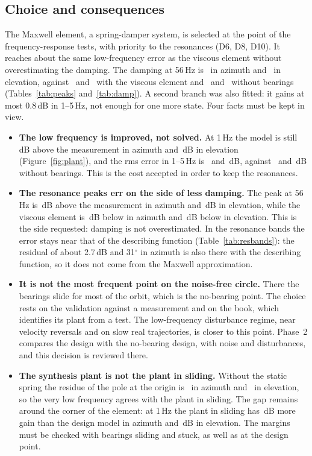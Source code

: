 \documentclass[10pt,a4paper]{article}
\numberwithin{equation}{section}
\begin{document}
\subsection{Choice and consequences}
The Maxwell element, a spring-damper system, is selected at the point of the frequency-response tests, with priority to the resonances (D6, D8, D10). It reaches about the same low-frequency error as the viscous element without overestimating the damping. The damping at 56\,Hz is \zMA\ in azimuth and \zMP\ in elevation, against \zVA\ and \zVP\ with the viscous element and \zNA\ and \zNP\ without bearings (Tables~\ref{tab:peaks} and~\ref{tab:damp}). A second branch was also fitted: it gains at most 0.8\,dB in 1--5\,Hz, not enough for one more state. Four facts must be kept in view.
\begin{itemize}
\item \textbf{The low frequency is improved, not solved.} At 1\,Hz the model is still \gapMA\,dB above the measurement in azimuth and \gapMP\,dB in elevation (Figure~\ref{fig:plant}), and the rms error in 1--5\,Hz is \lfMA\ and \lfMP\,dB, against \lfNA\ and \lfNP\,dB without bearings. This is the cost accepted in order to keep the resonances.
\item \textbf{The resonance peaks err on the side of less damping.} The peak at 56\,Hz is \pkMA\,dB above the measurement in azimuth and \pkMP\,dB in elevation, while the viscous element is \pkVA\,dB below in azimuth and \pkVP\,dB below in elevation. This is the side requested: damping is not overestimated. In the resonance bands the error stays near that of the describing function (Table~\ref{tab:resbands}): the residual of about 2.7\,dB and 31$^\circ$ in azimuth is also there with the describing function, so it does not come from the Maxwell approximation.
\item \textbf{It is not the most frequent point on the noise-free circle.} There the bearings slide for most of the orbit, which is the no-bearing point. The choice rests on the validation against a measurement and on the book, which identifies its plant from a test. The low-frequency disturbance regime, near velocity reversals and on slow real trajectories, is closer to this point. Phase~2 compares the design with the no-bearing design, with noise and disturbances, and this decision is reviewed there.
\item \textbf{The synthesis plant is not the plant in sliding.} Without the static spring the residue of the pole at the origin is \resA\ in azimuth and \resP\ in elevation, so the very low frequency agrees with the plant in sliding. The gap remains around the corner of the element: at 1\,Hz the plant in sliding has \gapSA\,dB more gain than the design model in azimuth and \gapSP\,dB in elevation. The margins must be checked with bearings sliding and stuck, as well as at the design point.
\end{itemize}
\end{document}
